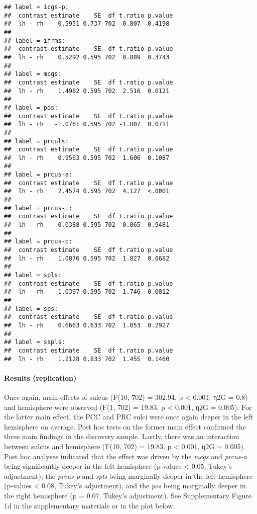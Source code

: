 \documentclass[
]{article}
\begin{document}
\begin{verbatim}
## label = icgs-p:
##  contrast estimate    SE  df t.ratio p.value
##  lh - rh    0.5951 0.737 702  0.807  0.4198 
## 
## label = ifrms:
##  contrast estimate    SE  df t.ratio p.value
##  lh - rh    0.5292 0.595 702  0.889  0.3743 
## 
## label = mcgs:
##  contrast estimate    SE  df t.ratio p.value
##  lh - rh    1.4982 0.595 702  2.516  0.0121 
## 
## label = pos:
##  contrast estimate    SE  df t.ratio p.value
##  lh - rh   -1.0761 0.595 702 -1.807  0.0711 
## 
## label = prculs:
##  contrast estimate    SE  df t.ratio p.value
##  lh - rh    0.9563 0.595 702  1.606  0.1087 
## 
## label = prcus-a:
##  contrast estimate    SE  df t.ratio p.value
##  lh - rh    2.4574 0.595 702  4.127  <.0001 
## 
## label = prcus-i:
##  contrast estimate    SE  df t.ratio p.value
##  lh - rh    0.0388 0.595 702  0.065  0.9481 
## 
## label = prcus-p:
##  contrast estimate    SE  df t.ratio p.value
##  lh - rh    1.0876 0.595 702  1.827  0.0682 
## 
## label = spls:
##  contrast estimate    SE  df t.ratio p.value
##  lh - rh    1.0397 0.595 702  1.746  0.0812 
## 
## label = sps:
##  contrast estimate    SE  df t.ratio p.value
##  lh - rh    0.6663 0.633 702  1.053  0.2927 
## 
## label = sspls:
##  contrast estimate    SE  df t.ratio p.value
##  lh - rh    1.2128 0.833 702  1.455  0.1460
\end{verbatim}

\hypertarget{results-replication}{%
\paragraph{Results (replication)}\label{results-replication}}

Once again, main effects of sulcus (F(10, 702) = 302.94, p \textless{}
0.001, η2G = 0.8) and hemisphere were observed (F(1, 702) = 19.83, p
\textless{} 0.001, η2G = 0.005). For the latter main effect, the PCC and
PRC sulci were once again deeper in the left hemisphere on average. Post
hoc tests on the former main effect confirmed the three main findings in
the discovery sample. Lastly, there was an interaction between sulcus
and hemisphere (F(10, 702) = 19.83, p \textless{} 0.001, η2G = 0.005).
Post hoc analyses indicated that the effect was driven by the
\emph{mcgs} and \emph{prcus-a} being significantly deeper in the left
hemisphere (p-values \textless{} 0.05, Tukey's adjustment), the
\emph{prcus-p} and \emph{spls} being marginally deeper in the left
hemisphere (p-values \textless{} 0.08, Tukey's adjustment), and the
\emph{pos} being marginally deeper in the right hemisphere (p = 0.07,
Tukey's adjustment). See Supplementary Figure 1d in the supplementary
materials or in the plot below.
\end{document}
